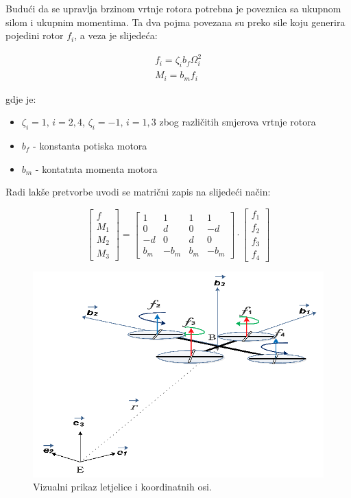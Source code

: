 \documentclass[times, utf8, diplomski, numeric]{fer}
\begin{document}
\noindent Budući da se upravlja brzinom vrtnje rotora potrebna je poveznica sa ukupnom silom i ukupnim momentima. Ta dva pojma povezana su preko sile koju generira pojedini rotor $f_i$, a veza je slijedeća:

\begin{gather}
	f_i = \zeta_i b_f \Omega_{i}^2 \\
	M_i = b_m f_i
\end{gather}

gdje je:
\begin{itemize}
	\item $\zeta_i = 1,\, i = 2, 4$, $\zeta_i = -1,\, i=1,3$ zbog različitih smjerova vrtnje rotora
	\item $b_f$ - konstanta potiska motora
	\item $b_m$ - kontatnta momenta motora
\end{itemize}

\newpage
\clearpage

Radi lakše pretvorbe uvodi se matrični zapis na slijedeći način: 

\begin{equation}
	\begin{bmatrix}
		f \\
		M_1 \\
		M_2 \\
		M_3 
	\end{bmatrix} 
	=
	\begin{bmatrix}
		1	&	1	&	1	&	1 \\
		0	&	d	&	0	&	-d \\
		-d 	&	0	&	d	&	0 \\
		b_m &	-b_m	& 	b_m	& -b_m
	\end{bmatrix}
	\cdot
	\begin{bmatrix}
		f_1 \\
		f_2 \\
		f_3 \\
		f_4
	\end{bmatrix}
\end{equation}

\begin{figure}[h!]
	\includegraphics[width=\textwidth]{figures/model.png}
	\caption{Vizualni prikaz letjelice i koordinatnih osi.}
\end{figure}
\end{document}
